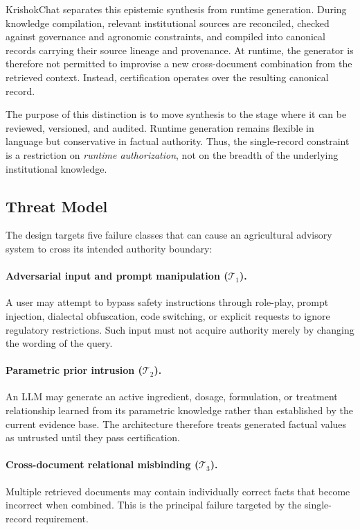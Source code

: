 \documentclass[a4paper,fleqn]{cas-dc}
\begin{document}
KrishokChat separates this epistemic synthesis from runtime generation. During knowledge compilation, relevant institutional sources are reconciled, checked against governance and agronomic constraints, and compiled into canonical records carrying their source lineage and provenance. At runtime, the generator is therefore not permitted to improvise a new cross-document combination from the retrieved context. Instead, certification operates over the resulting canonical record.

The purpose of this distinction is to move synthesis to the stage where it can be reviewed, versioned, and audited. Runtime generation remains flexible in language but conservative in factual authority. Thus, the single-record constraint is a restriction on \emph{runtime authorization}, not on the breadth of the underlying institutional knowledge.

\subsection{Threat Model}
\label{sec:threat_model}

The design targets five failure classes that can cause an agricultural advisory system to cross its intended authority boundary:

\paragraph{Adversarial input and prompt manipulation ($\mathcal{T}_1$).}
A user may attempt to bypass safety instructions through role-play, prompt injection, dialectal obfuscation, code switching, or explicit requests to ignore regulatory restrictions. Such input must not acquire authority merely by changing the wording of the query.

\paragraph{Parametric prior intrusion ($\mathcal{T}_2$).}
An LLM may generate an active ingredient, dosage, formulation, or treatment relationship learned from its parametric knowledge rather than established by the current evidence base. The architecture therefore treats generated factual values as untrusted until they pass certification.

\paragraph{Cross-document relational misbinding ($\mathcal{T}_3$).}
Multiple retrieved documents may contain individually correct facts that become incorrect when combined. This is the principal failure targeted by the single-record requirement.
\end{document}
